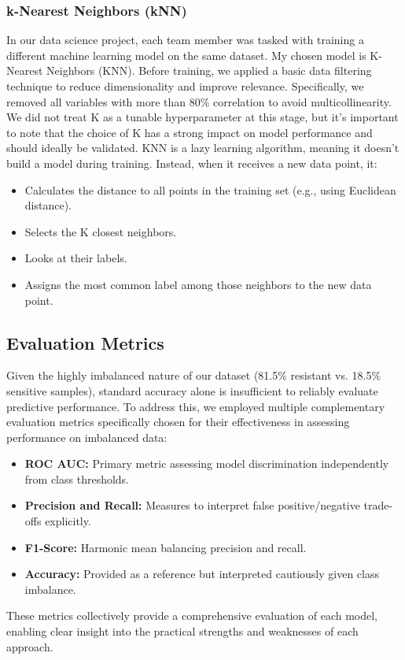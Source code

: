 \documentclass{article}
\begin{document}
\subsubsection{k-Nearest Neighbors (kNN)}
In our data science project, each team member was tasked with training a different machine learning model on the same dataset. My chosen model is K-Nearest Neighbors (KNN).
Before training, we applied a basic data filtering technique to reduce dimensionality and improve relevance. Specifically, we removed all variables with more than 80\% correlation to avoid multicollinearity. We did not treat K as a tunable hyperparameter at this stage, but it's important to note that the choice of K has a strong impact on model performance and should ideally be validated. KNN is a lazy learning algorithm, meaning it doesn’t build a model during training. Instead, when it receives a new data point, it:
\begin{itemize}
    \item Calculates the distance to all points in the training set (e.g., using Euclidean distance).
    \item Selects the K closest neighbors.
    \item Looks at their labels.
    \item Assigns the most common label among those neighbors to the new data point.
\end{itemize}

\subsection{Evaluation Metrics}
Given the highly imbalanced nature of our dataset (81.5\% resistant vs. 18.5\% sensitive samples), standard accuracy alone is insufficient to reliably evaluate predictive performance. To address this, we employed multiple complementary evaluation metrics specifically chosen for their effectiveness in assessing performance on imbalanced data:
\begin{itemize}
    \item \textbf{ROC AUC:} Primary metric assessing model discrimination independently from class thresholds.
    \item \textbf{Precision and Recall:} Measures to interpret false positive/negative trade-offs explicitly.
    \item \textbf{F1-Score:} Harmonic mean balancing precision and recall.
    \item \textbf{Accuracy:} Provided as a reference but interpreted cautiously given class imbalance.
\end{itemize}
These metrics collectively provide a comprehensive evaluation of each model, enabling clear insight into the practical strengths and weaknesses of each approach.
\end{document}
